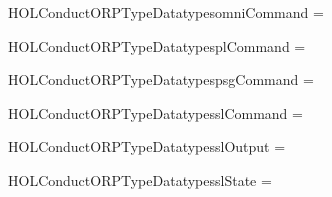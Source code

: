 \newcommand{\HOLConductORPTypeDate}{11 June 2018}
\newcommand{\HOLConductORPTypeTime}{16:11}
\begin{SaveVerbatim}{HOLConductORPTypeDatatypesomniCommand}
 =  \HOLTokenBar{} 
            \HOLTokenBar{}  \HOLTokenBar{} 
\end{SaveVerbatim}
\newcommand{\HOLConductORPTypeDatatypesomniCommand}{\UseVerbatim{HOLConductORPTypeDatatypesomniCommand}}
\begin{SaveVerbatim}{HOLConductORPTypeDatatypesplCommand}
 =  \HOLTokenBar{}  \HOLTokenBar{}  \HOLTokenBar{} 
\end{SaveVerbatim}
\newcommand{\HOLConductORPTypeDatatypesplCommand}{\UseVerbatim{HOLConductORPTypeDatatypesplCommand}}
\begin{SaveVerbatim}{HOLConductORPTypeDatatypespsgCommand}
 =  \HOLTokenBar{} 
\end{SaveVerbatim}
\newcommand{\HOLConductORPTypeDatatypespsgCommand}{\UseVerbatim{HOLConductORPTypeDatatypespsgCommand}}
\begin{SaveVerbatim}{HOLConductORPTypeDatatypesslCommand}
 =   \HOLTokenBar{}   \HOLTokenBar{}  
\end{SaveVerbatim}
\newcommand{\HOLConductORPTypeDatatypesslCommand}{\UseVerbatim{HOLConductORPTypeDatatypesslCommand}}
\begin{SaveVerbatim}{HOLConductORPTypeDatatypesslOutput}
 =  \HOLTokenBar{}  \HOLTokenBar{}  \HOLTokenBar{}  \HOLTokenBar{} 
         \HOLTokenBar{}  \HOLTokenBar{} 
\end{SaveVerbatim}
\newcommand{\HOLConductORPTypeDatatypesslOutput}{\UseVerbatim{HOLConductORPTypeDatatypesslOutput}}
\begin{SaveVerbatim}{HOLConductORPTypeDatatypesslState}
 =  \HOLTokenBar{}  \HOLTokenBar{}  \HOLTokenBar{} 
        \HOLTokenBar{} 
\end{SaveVerbatim}
